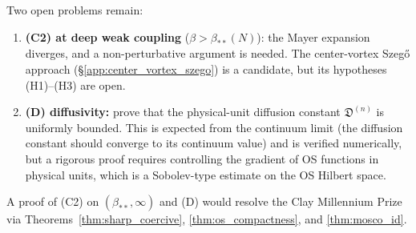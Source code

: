 \begin{remark}
\label{rem:adv_open}
Two open problems remain:
\begin{enumerate}
\item \textbf{(C2) at deep weak coupling}
($\beta>\beta_{**}(N)$): the Mayer expansion diverges, and a
non-perturbative argument is needed. The center-vortex Szeg\H{o}
approach (\S\ref{app:center_vortex_szego}) is a candidate, but its
hypotheses (H1)--(H3) are open.
\item \textbf{(D) diffusivity:} prove that the physical-unit
diffusion constant $\mathfrak{D}^{(n)}$ is uniformly bounded. This
is expected from the continuum limit (the diffusion constant
should converge to its continuum value) and is verified
numerically, but a rigorous proof requires controlling the
gradient of OS functions in physical units, which is a
Sobolev-type estimate on the OS Hilbert space.
\end{enumerate}
A proof of (C2) on $(\beta_{**},\infty)$ and (D) would resolve
the Clay Millennium Prize via
Theorems~\ref{thm:sharp_coercive}, \ref{thm:os_compactness}, and
\ref{thm:mosco_id}.
\end{remark}

\endinput
